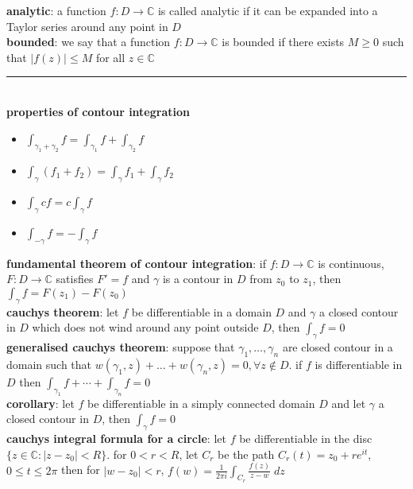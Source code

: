 \documentclass[a4paper]{article}
\newcommand*\abs[1]{\vert #1 \vert}
\newcommand*\linesep[0]{\noindent\rule{\textwidth}{0.5pt}\\}
\begin{document}
\begin{framed}
	\noindent
	\textbf{analytic}: a function $f: D \rightarrow \mathbb{C}$ is called analytic if it can be expanded into a Taylor series around any point in $D$\\
	
	\noindent
	\textbf{bounded}: we say that a function $f: D \rightarrow \mathbb{C}$ is bounded if there exists $M \geq 0$ such that $\abs{f(z)} \leq M$ for all $z \in \mathbb{C}$
	
	\linesep
	
	\noindent
	\textbf{properties of contour integration}
	\begin{multicols}{2}
		\begin{itemize}
			\item $\int_{\gamma_1 + \gamma_2} f = \int_{\gamma_1} f + \int_{\gamma_2} f$
			\item $\int_\gamma (f_1 + f_2) = \int_\gamma f_1 + \int_\gamma f_2$
			\item $\int_\gamma cf = c \int_\gamma f$
			\item $\int_{-\gamma} f = - \int_\gamma f$
		\end{itemize}
	\end{multicols}
	
	\noindent
	\textbf{fundamental theorem of contour integration}: if $f: D \rightarrow \mathbb{C}$ is continuous, $F: D \rightarrow \mathbb{C}$ satisfies $F' = f$ and $\gamma$ is a contour in $D$ from $z_0$ to $z_1$, then $\int_\gamma f = F(z_1) - F(z_0)$\\
	
	\noindent
	\textbf{cauchys theorem}: let $f$ be differentiable in a domain $D$ and $\gamma$ a closed contour in $D$ which does not wind around any point outside $D$, then $\int_\gamma f = 0$\\
	
	\noindent
	\textbf{generalised cauchys theorem}: suppose that $\gamma_1, \dots, \gamma_n$ are closed contour in a domain such that $w(\gamma_1, z) + \dots + w(\gamma_n, z) = 0, \forall z \notin D$. if $f$ is differentiable in $D$ then $\int_{\gamma_1} f + \cdots + \int_{\gamma_n} f = 0$\\
	
	\noindent
	\textbf{corollary}: let $f$ be differentiable in a simply connected domain $D$ and let $\gamma$ a closed contour in $D$, then $\int_\gamma f = 0$\\
	
	\noindent
	\textbf{cauchys integral formula for a circle}: let $f$ be differentiable in the disc $\{ z \in \mathbb{C} : \abs{z - z_0} < R \}$. for $0 < r < R$, let $C_r$ be the path $C_r(t) = z_0 + re^{it}$, $0 \leq t \leq 2\pi$ then for $\abs{w - z_0} < r$, $f(w) = \frac{1}{2\pi i} \int_{C_r} \frac{f(z)}{z - w} \; dz$\\
	

\end{framed}
\end{document}
